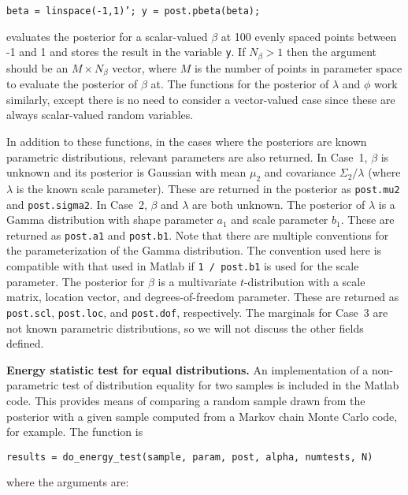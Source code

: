 \documentclass{book}
\begin{document}
\vspace{.1in}
 {\tt beta = linspace(-1,1)'; y = post.pbeta(beta);} 
\vspace{.1in}

\noindent evaluates the posterior for a scalar-valued $\beta$ at 100 evenly spaced points between -1 and 1 and stores the result
in the variable {\tt y}. If $N_\beta > 1$ then the argument should be an $M \times N_\beta$ vector, where $M$ is the
number of points in parameter space to evaluate the posterior of $\beta$ at. The functions for the posterior of
$\lambda$ and $\phi$ work similarly, except there is no need to consider a vector-valued case since these are always
scalar-valued random variables. 

In addition to these functions, in the cases where the posteriors are known parametric distributions, relevant
parameters are also returned. In Case~1, $\beta$ is unknown and its posterior is Gaussian with mean $\mu_2$
and covariance $\Sigma_2 / \lambda$ (where $\lambda$ is the known scale parameter). These are returned in the
posterior as {\tt post.mu2} and {\tt post.sigma2}. In Case~2, $\beta$ and $\lambda$ are both unknown. The posterior
of $\lambda$ is a Gamma distribution with shape parameter $a_1$ and scale parameter $b_1$. These are returned
as {\tt post.a1} and {\tt post.b1}. Note that there are multiple conventions for the parameterization of the Gamma
distribution. The convention used here is compatible with that used in Matlab if {\tt 1 / post.b1} is used for the scale
parameter. The posterior for $\beta$ is a multivariate $t$-distribution with a scale matrix, location vector, and 
degrees-of-freedom parameter. These are returned as {\tt post.scl}, {\tt post.loc}, and {\tt post.dof}, respectively. 
The marginals for Case~3 are not known parametric distributions, so we will not discuss the other fields defined.

\vspace{.1in}
\textbf{Energy statistic test for equal distributions.} An implementation of a non-parametric test of distribution equality
for two samples is included in the Matlab code. This provides means of comparing a random sample drawn from the
posterior with a given sample computed from a Markov chain Monte Carlo code, for example. The function is

\vspace{.1in}
{\tt results = do\_energy\_test(sample, param, post, alpha, numtests, N)}

\vspace{.1in}
\noindent where the arguments are: 
\end{document}
